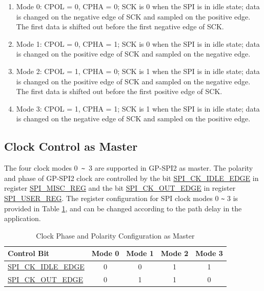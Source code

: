 \documentclass[main\_\_EN.tex]{subfiles}
\begin{document}
\begin{enumerate}
    \item Mode 0: CPOL = 0, CPHA = 0; SCK is 0 when the SPI is in idle state; data is changed on the negative edge of SCK and sampled on the positive edge. The first data is shifted out before the first negative edge of SCK.

    \item Mode 1: CPOL = 0, CPHA = 1; SCK is 0 when the SPI is in idle state; data is changed on the positive edge of SCK and sampled on the negative edge.

    \item Mode 2: CPOL = 1, CPHA = 0; SCK is 1 when the SPI is in idle state; data is changed on the positive edge of SCK and sampled on the negative edge. The first data is shifted out before the first positive edge of SCK.

    \item Mode 3: CPOL = 1, CPHA = 1; SCK is 1 when the SPI is in idle state; data is changed on the negative edge of SCK and sampled on the positive edge.
\end{enumerate}


\subsection{Clock Control as Master}\label{sec:spi-master-clock-control}

The four clock modes 0\verb+ ~ +3 are supported in GP-SPI2 as master. The polarity and phase of GP-SPI2 clock are controlled by the bit \hyperref[fielddesc:SPICKIDLEEDGE]{SPI\_CK\_IDLE\_EDGE} in register \hyperref[regdesc:SPIMISCREG]{SPI\_MISC\_REG} and the bit \hyperref[fielddesc:SPICKOUTEDGE]{SPI\_CK\_OUT\_EDGE} in register \hyperref[regdesc:SPIUSERREG]{SPI\_USER\_REG}. The register configuration for SPI clock modes 0 \verb+~+ 3 is provided in Table \ref{tab:spi-clk-phase-polarity-config-master}, and can be changed according to the path delay in the application.

\begin{table}[H]
    \centering
    \caption{Clock Phase and Polarity Configuration as Master}
    \label{tab:spi-clk-phase-polarity-config-master}
    \begin{tabular}[c]{|p{3.5cm}|c|c|c|c|}
    \hline
    \rowcolor{lightgray}
    \textbf{Control Bit} & \textbf{Mode 0} & \textbf{Mode 1} & \textbf{Mode 2} & \textbf{Mode 3}\\
    \hline
    \hyperref[fielddesc:SPICKIDLEEDGE]{SPI\_CK\_IDLE\_EDGE}  & 0     & 0     & 1     & 1\\
    \hline
    \hyperref[fielddesc:SPICKOUTEDGE]{SPI\_CK\_OUT\_EDGE}   & 0     & 1     & 1     & 0\\
    \hline
    \end{tabular}
\end{table}
\end{document}
